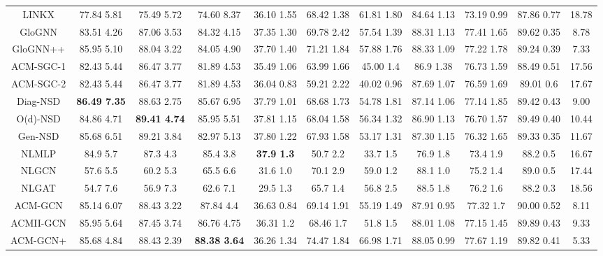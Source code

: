 \documentclass{article}
\newcommand{\0}{{\boldsymbol{0}}}
\newcommand{\6}{{\partial}}
\newcommand{\8}{{\infty}}
\newcommand{\4}{{\nabla}}
\begin{document}
\begin{table}[htbp]
{\begin{tabular}{c|ccccccccc|c}
    LINKX &  77.84  5.81  & 75.49  5.72 & 74.60  8.37  & 36.10  1.55  & 68.42  1.38  & 61.81  1.80 & 84.64  1.13 & 73.19  0.99 & 87.86  0.77 & 18.78 \\
    GloGNN & 83.51  4.26 & 87.06  3.53  & 84.32  4.15  & 37.35  1.30 & 69.78  2.42  & 57.54  1.39  & 88.31  1.13 & 77.41  1.65  & 89.62  0.35 & 8.78 \\
    GloGNN++ & 85.95  5.10  &  88.04  3.22  & 84.05  4.90 & 37.70  1.40  & 71.21  1.84  & 57.88  1.76  & 88.33  1.09  & 77.22  1.78  & 89.24  0.39 & 7.33 \\
    ACM-SGC-1 & 82.43  5.44 & 86.47  3.77 & 81.89  4.53 & 35.49  1.06 & 63.99  1.66 & 45.00  1.4 & 86.9  1.38 & 76.73  1.59 & 88.49  0.51 & 17.56 \\
    ACM-SGC-2 & 82.43  5.44 & 86.47  3.77 & 81.89  4.53 & 36.04  0.83 & 59.21  2.22 & 40.02  0.96 & 87.69  1.07 & 76.59  1.69 & 89.01  0.6 & 17.67 \\
    Diag-NSD & \cellcolor[rgb]{ .816,  .808,  .808}\textbf{86.49  7.35} & 88.63  2.75 & 85.67  6.95 & 37.79  1.01 & 68.68  1.73 & 54.78  1.81 & 87.14  1.06 & 77.14  1.85 & 89.42  0.43 & 9.00 \\
    O(d)-NSD & 84.86  4.71 & \cellcolor[rgb]{ .816,  .808,  .808}\textbf{89.41  4.74} & 85.95  5.51 & 37.81  1.15 & 68.04  1.58 & 56.34  1.32 & 86.90  1.13 & 76.70  1.57 & 89.49  0.40 & 10.44 \\
    Gen-NSD & 85.68  6.51 & 89.21  3.84 & 82.97  5.13  & 37.80  1.22 & 67.93  1.58 & 53.17  1.31 & 87.30  1.15 & 76.32  1.65 & 89.33  0.35 & 11.67 \\
    NLMLP  & 84.9  5.7 & 87.3  4.3  & 85.4  3.8 & \cellcolor[rgb]{ .816,  .808,  .808}\textbf{37.9  1.3} & 50.7  2.2 & 33.7  1.5 & 76.9  1.8 & 73.4  1.9 & 88.2  0.5 & 16.67 \\
    NLGCN  & 57.6  5.5 & 60.2  5.3  & 65.5  6.6 & 31.6  1.0 & 70.1  2.9 & 59.0  1.2 & 88.1  1.0 & 75.2  1.4 & 89.0  0.5 & 17.44 \\
    NLGAT  & 54.7  7.6 & 56.9  7.3 & 62.6  7.1 & 29.5  1.3 & 65.7  1.4 & 56.8  2.5 & 88.5  1.8 & 76.2  1.6 & 88.2  0.3 & 18.56 \\
    \midrule
    ACM-GCN & 85.14  6.07 & 88.43  3.22 & 87.84  4.4 & 36.63  0.84 & 69.14  1.91 & 55.19  1.49 & 87.91  0.95 & 77.32  1.7 & 90.00  0.52 & 8.11 \\
    ACMII-GCN & 85.95  5.64 & 87.45  3.74 & 86.76  4.75 & 36.31  1.2 & 68.46  1.7 & 51.8  1.5 & 88.01  1.08 & 77.15  1.45 & 89.89  0.43 & 9.33 \\
    ACM-GCN+ & 85.68  4.84 & 88.43  2.39 & \cellcolor[rgb]{ .816,  .808,  .808}\textbf{88.38  3.64} & 36.26  1.34 & 74.47  1.84 & 66.98  1.71 & 88.05  0.99 & 77.67  1.19 & 89.82  0.41 & 5.33 \\

\end{tabular}}
\end{table}
\end{document}
